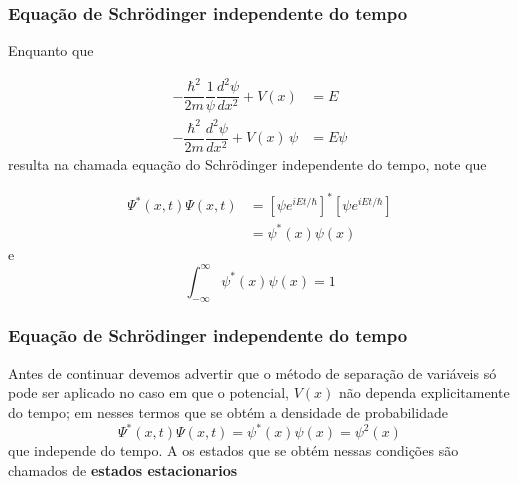 \documentclass[12pt,brazil,table]{beamer}
\begin{document}

\begin{frame}
  \frametitle{Equação de Schrödinger independente do tempo}
  \fontsize{11pt}{11pt}\selectfont
  
  Enquanto que
  
    \[
      \begin{align*}
        -\dfrac{\hbar^2}{2m}\dfrac{1}{\psi}\dfrac{d^2\psi}{dx^2} +V(x)&= E\\
        -\dfrac{\hbar^2}{2m}\dfrac{d^2\psi}{dx^2} +V(x)\,\psi&= E\psi
      \end{align*}
    \]
     resulta na chamada equação do Schrödinger independente do tempo, note que
     
    \[
      \begin{align*}
        \Psi^*(x,t)\Psi(x,t) &= \left[\psi e^{iEt/\hbar}\right]^*\left[\psi e^{iEt/\hbar}\right]\\
        &=\psi^*(x)\psi(x)
      \end{align*}      
    \]
    e
    \[
     \int_{-\infty}^\infty \psi^*(x)\psi(x) = 1
    \]

  
\end{frame}




\begin{frame}
  \frametitle{Equação de Schrödinger independente do tempo}
  \fontsize{11pt}{11pt}\selectfont
  
  Antes de continuar devemos advertir que o método de separação de variáveis só pode ser aplicado no caso em que o potencial, $V(x)$ não dependa explicitamente do tempo; em nesses termos que se obtém a densidade de probabilidade
  \[
    \Psi^*(x,t)\Psi(x,t) = \psi^*(x)\psi(x) = \psi^2(x)
  \]
  que independe do tempo.  A os estados que se obtém nessas condições são chamados de \textbf{estados estacionarios}

  

\end{frame}
\end{document}
